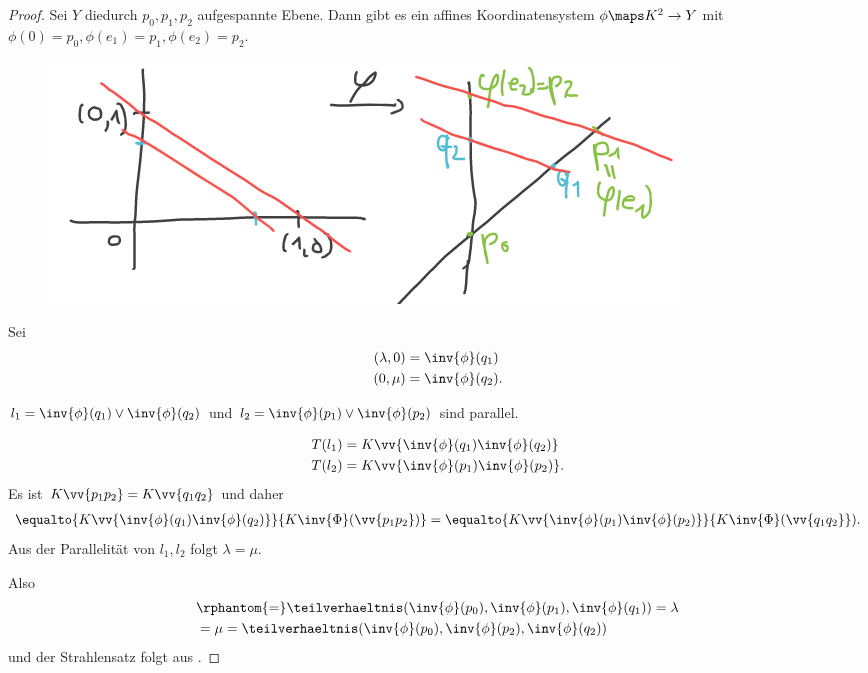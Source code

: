 \begin{proof}
    Sei \( Y \) diedurch \( p_0,p_1,p_2 \) aufgespannte Ebene. Dann gibt es ein affines Koordinatensystem \( \phi\maps K^2 \to Y \) mit \( \phi(0)=p_0, \phi(e_1)=p_1, \phi(e_2)=p_2 \).
    \begin{figure}[H]
        \centering
        \includegraphics[width=0.5\linewidth]{figures/strahlensatz_koordinatensystem}
        \label{fig:strahlensatz_koordinatensystem}
    \end{figure}
    Sei
    \begin{align*}
        (\lambda,0)&=\inv{\phi}(q_1)\\
        (0,\mu)&=\inv{\phi}(q_2).
    \end{align*}    
    \begin{behauptung*}
        \( l_1=\inv{\phi}(q_1)\vee \inv{\phi}(q_2) \) und \( l_2=\inv{\phi}(p_1)\vee \inv{\phi}(p_2) \) sind parallel.
    \end{behauptung*}
    \begin{align*}
        T(l_1)&=K\vv{\inv{\phi}(q_1) \inv{\phi}(q_2)}\\
        T(l_2)&=K\vv{\inv{\phi}(p_1) \inv{\phi}(p_2)}.
    \end{align*}
    Es ist \( K\vv{p_1 p_2}=K\vv{q_1 q_2} \) und daher
    \begin{align*}
        \equalto{K\vv{\inv{\phi}(q_1) \inv{\phi}(q_2)}}{K \inv{\Phi}(\vv{p_1 p_2})}=\equalto{K\vv{\inv{\phi}(p_1) \inv{\phi}(p_2)}}{K\inv{\Phi}(\vv{q_1 q_2}}).
    \end{align*}
    Aus der Parallelität von \( l_1,l_2 \) folgt \( \lambda=\mu \).

    Also
    \begin{align*}
        &\rphantom{=}\teilverhaeltnis(\inv{\phi}(p_0),\inv{\phi}(p_1),\inv{\phi}(q_1))=\lambda\\
        &=\mu=\teilverhaeltnis(\inv{\phi}(p_0),\inv{\phi}(p_2),\inv{\phi}(q_2))
    \end{align*}
    und der Strahlensatz folgt aus .
\end{proof}

